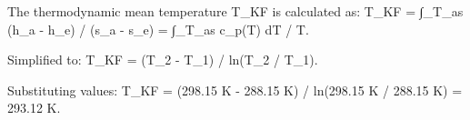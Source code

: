 The thermodynamic mean temperature T_KF is calculated as:  
T_KF = ∫_T_as (h_a - h_e) / (s_a - s_e) = ∫_T_as c_p(T) dT / T.  

Simplified to:  
T_KF = (T_2 - T_1) / ln(T_2 / T_1).  

Substituting values:  
T_KF = (298.15 K - 288.15 K) / ln(298.15 K / 288.15 K) = 293.12 K.